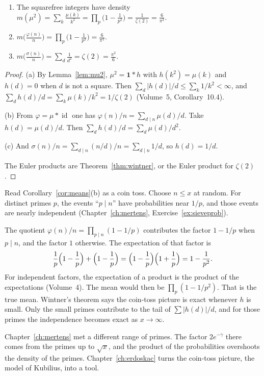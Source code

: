 \begin{corollary}\label{cor:means}
\begin{enumerate}[label=(\alph*)]
\item The squarefree integers have density $m(\mu^2)=\sum_k\frac{\mu(k)}{k^2}=\prod_p\bigl(1-\frac1{p^2}\bigr)=\frac1{\zeta(2)}=\frac6{\pi^2}$.
\item $m\bigl(\frac{\varphi(n)}n\bigr)=\prod_p\bigl(1-\frac1{p^2}\bigr)=\frac6{\pi^2}$.
\item $m\bigl(\frac{\sigma(n)}n\bigr)=\sum_d\frac1{d^2}=\zeta(2)=\frac{\pi^2}6$.
\end{enumerate}
\end{corollary}
\begin{proof}
(a) By Lemma~\ref{lem:mu2}, $\mu^2=\mathbf1*h$ with $h(k^2)=\mu(k)$ and $h(d)=0$ when $d$ is not a square. Then $\sum_d|h(d)|/d\le\sum_k 1/k^2<\infty$, and $\sum_d h(d)/d=\sum_k\mu(k)/k^2=1/\zeta(2)$ (Volume~5, Corollary~10.4).

(b) From $\varphi=\mu*\operatorname{id}$ one has $\varphi(n)/n=\sum_{d\mid n}\mu(d)/d$. Take $h(d)=\mu(d)/d$. Then $\sum_d h(d)/d=\sum_d\mu(d)/d^2$.

(c) And $\sigma(n)/n=\sum_{d\mid n}(n/d)/n=\sum_{d\mid n}1/d$, so $h(d)=1/d$.

The Euler products are Theorem~\ref{thm:wintner}, or the Euler product for $\zeta(2)$.
\end{proof}

\begin{beauty}
Read Corollary~\ref{cor:means}(b) as a coin toss. Choose $n\le x$ at random. For distinct primes $p$, the events ``$p\mid n$'' have probabilities near $1/p$, and those events are nearly independent (Chapter~\ref{ch:mertens}, Exercise~\ref{ex:sieveprob}).

The quotient $\varphi(n)/n=\prod_{p\mid n}(1-1/p)$ contributes the factor $1-1/p$ when $p\mid n$, and the factor $1$ otherwise. The expectation of that factor is
\[
\frac1p\Bigl(1-\frac1p\Bigr)+\Bigl(1-\frac1p\Bigr)=\Bigl(1-\frac1p\Bigr)\Bigl(1+\frac1p\Bigr)=1-\frac1{p^2}.
\]
For independent factors, the expectation of a product is the product of the expectations (Volume~4). The mean would then be $\prod_p(1-1/p^2)$. That is the true mean. Wintner's theorem says the coin-toss picture is exact whenever $h$ is small. Only the small primes contribute to the tail of $\sum|h(d)|/d$, and for those primes the independence becomes exact as $x\to\infty$.

Chapter~\ref{ch:mertens} met a different range of primes. The factor $2e^{-\gamma}$ there comes from the primes up to $\sqrt x$, and the product of the probabilities overshoots the density of the primes. Chapter~\ref{ch:erdoskac} turns the coin-toss picture, the model of Kubilius, into a tool.
\end{beauty}

